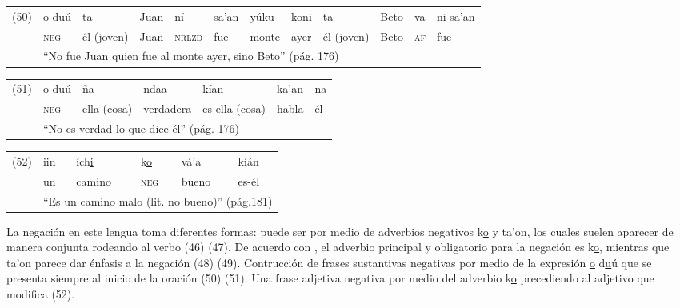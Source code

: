 {%
\noindent \begin{tabular}{llllllllllll}
 (50) & \underline{o} d\underline{u}ú & ta & Juan & ní & sa'\underline{a}n & yúk\underline{u} & koni & ta & Beto & va & n\underline{i} sa'\underline{a}n \\
 & \textsc{neg} & él (joven) & Juan & \textsc{nrlzd} & fue & monte & ayer & él (joven) & Beto & \textsc{af} & fue \\
 & \multicolumn{11}{l}{``No fue Juan quien fue al monte ayer, sino Beto'' (pág. 176)}
\end{tabular} \vspace{0.2cm}

\begin{tabular}{lllllll}
(51) & \underline{o} d\underline{u}ú & ña & nda\underline{a} & kí\underline{a}n & ka'\underline{a}n & n\underline{a} \\
& \textsc{neg} & ella (cosa) & verdadera & es-ella (cosa) & habla & él \\
& \multicolumn{6}{l}{``No es verdad lo que dice él'' (pág. 176)}
\end{tabular} \vspace{0.2cm}

\begin{tabular}{llllll}
(52) & iin & ích\underline{i} & k\underline{o} & vá'a & kíán \\
& un & camino & \textsc{neg} & bueno & es-él \\
& \multicolumn{5}{l}{``Es un camino malo (lit. no bueno)'' (pág.181)}
\end{tabular} \vspace{0.3cm}
}

La negación en este lengua toma diferentes formas: puede ser por medio de adverbios negativos {\setmainfont{Doulos SIL} k\underline{o} y ta'on}, los cuales suelen aparecer de manera conjunta rodeando al verbo (46) (47). De acuerdo con \textcolor{MidnightBlue}{\citet{Mixteco}}, el adverbio principal y obligatorio para la negación es {\setmainfont{Doulos SIL} k\underline{o}}, mientras que {\setmainfont{Doulos SIL} ta'on} parece dar énfasis a la negación (48) (49). Contrucción de frases sustantivas negativas por medio de la expresión {\setmainfont{Doulos SIL} \underline{o} d\underline{u}ú} que se presenta siempre al inicio de la oración (50) (51). Una frase adjetiva negativa por medio del adverbio {\setmainfont{Doulos SIL} k\underline{o}} precediendo al adjetivo que modifica (52).